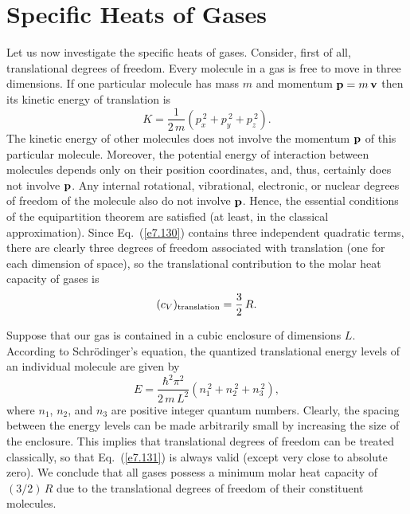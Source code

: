\section{Specific Heats of Gases}
Let us now investigate the specific heats of gases. Consider, first of all, 
translational degrees of freedom. Every molecule in a gas is free to move in
three dimensions. If one particular 
molecule has mass $m$ and momentum ${\bf p} = m\, {\bf v}$
then its kinetic energy of translation is
\begin{equation}
K = \frac{1}{2\,m} (p_x^{~2}+ p_y^{~2}+p_z^{~2}).\label{e7.130}
\end{equation}
The kinetic energy of other molecules does not involve the momentum ${\bf p}$
of this particular molecule. 
Moreover, the potential energy of interaction between molecules
depends only on their position coordinates, and, thus, certainly does not involve
${\bf p}$. Any internal rotational, vibrational, electronic, or nuclear degrees
of freedom of the molecule also do not involve ${\bf p}$. Hence, the essential
conditions of the equipartition theorem are satisfied (at least, in the classical
approximation). Since Eq.~(\ref{e7.130}) contains three independent
 quadratic terms, there
are clearly three degrees of freedom associated with translation (one for each
 dimension of space), so the translational contribution to the molar heat capacity
of gases is
\begin{equation}
(c_V)_{\rm translation} = \frac{3}{2}\,R.\label{e7.131}
\end{equation}

Suppose that our gas is contained in a cubic enclosure of dimensions $L$. According
to Schr\"{o}dinger's equation, the quantized translational 
energy levels of an individual molecule are given by
\begin{equation}
E = \frac{\hbar^2 \pi^2}{2\, m\, L^2} \left(n_1^{~2}+n_2^{~2}+ n_3^{~2}\right),
\end{equation}
where $n_1$, $n_2$, and $n_3$ are positive integer quantum numbers. Clearly, the 
spacing between the energy levels can be made arbitrarily small by increasing the
size of the enclosure. This implies that translational degrees of freedom can
 be treated classically, so that
Eq.~(\ref{e7.131}) is always valid (except very close to absolute zero). 
We conclude that  all
gases  possess a minimum molar heat capacity of $(3/2)\,R$ due to the
translational degrees of freedom of their constituent molecules.
 
